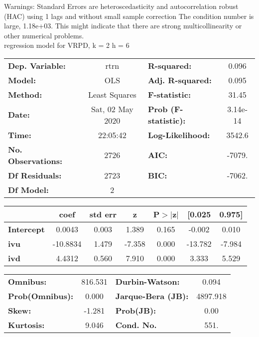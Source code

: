 Warnings: \newline
 [1] Standard Errors are heteroscedasticity and autocorrelation robust (HAC) using 1 lags and without small sample correction \newline
 [2] The condition number is large, 1.18e+03. This might indicate that there are \newline
 strong multicollinearity or other numerical problems.\\ 

regression model for VRPD, k = 2 h = 6\begin{center}
\begin{tabular}{lclc}
\toprule
\textbf{Dep. Variable:}    &       rtrn       & \textbf{  R-squared:         } &     0.096   \\
\textbf{Model:}            &       OLS        & \textbf{  Adj. R-squared:    } &     0.095   \\
\textbf{Method:}           &  Least Squares   & \textbf{  F-statistic:       } &     31.45   \\
\textbf{Date:}             & Sat, 02 May 2020 & \textbf{  Prob (F-statistic):} &  3.14e-14   \\
\textbf{Time:}             &     22:05:42     & \textbf{  Log-Likelihood:    } &    3542.6   \\
\textbf{No. Observations:} &        2726      & \textbf{  AIC:               } &    -7079.   \\
\textbf{Df Residuals:}     &        2723      & \textbf{  BIC:               } &    -7062.   \\
\textbf{Df Model:}         &           2      & \textbf{                     } &             \\
\bottomrule
\end{tabular}
\begin{tabular}{lcccccc}
                   & \textbf{coef} & \textbf{std err} & \textbf{z} & \textbf{P$> |$z$|$} & \textbf{[0.025} & \textbf{0.975]}  \\
\midrule
\textbf{Intercept} &       0.0043  &        0.003     &     1.389  &         0.165        &       -0.002    &        0.010     \\
\textbf{ivu}       &     -10.8834  &        1.479     &    -7.358  &         0.000        &      -13.782    &       -7.984     \\
\textbf{ivd}       &       4.4312  &        0.560     &     7.910  &         0.000        &        3.333    &        5.529     \\
\bottomrule
\end{tabular}
\begin{tabular}{lclc}
\textbf{Omnibus:}       & 816.531 & \textbf{  Durbin-Watson:     } &    0.094  \\
\textbf{Prob(Omnibus):} &   0.000 & \textbf{  Jarque-Bera (JB):  } & 4897.918  \\
\textbf{Skew:}          &  -1.281 & \textbf{  Prob(JB):          } &     0.00  \\
\textbf{Kurtosis:}      &   9.046 & \textbf{  Cond. No.          } &     551.  \\
\bottomrule
\end{tabular}
\end{center}

